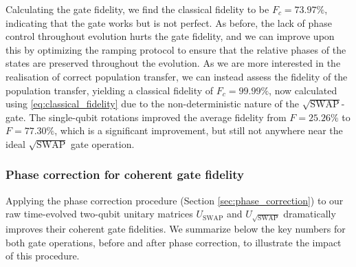 \documentclass{subfiles}
\begin{document}
Calculating the gate fidelity, we find the classical fidelity to be $F_c = 73.97\%$, indicating that the gate works but is not perfect. As before, the lack of phase control throughout evolution hurts the gate fidelity, and we can improve upon this by optimizing the ramping protocol to ensure that the relative phases of the states are preserved throughout the evolution. As we are more interested in the realisation of correct population transfer, we can instead assess the fidelity of the population transfer, yielding a classical fidelity of $F_c = 99.99\%$, now calculated using \eqref{eq:classical_fidelity} due to the non-deterministic nature of the $\sqrt{\text{SWAP}}$-gate. The single-qubit rotations improved the average fidelity from $F = 25.26\%$ to $F = 77.30\%$, which is a significant improvement, but still not anywhere near the ideal $\sqrt{\text{SWAP}}$ gate operation. 

\subsubsection*{Phase correction for coherent gate fidelity}
Applying the phase correction procedure (Section \ref{sec:phase_correction}) to our raw time-evolved two-qubit unitary matrices $U_{\text{SWAP}}$ and $U_{\sqrt{\text{SWAP}}}$ dramatically improves their coherent gate fidelities. We summarize below the key numbers for both gate operations, before and after phase correction, to illustrate the impact of this procedure.
\end{document}
